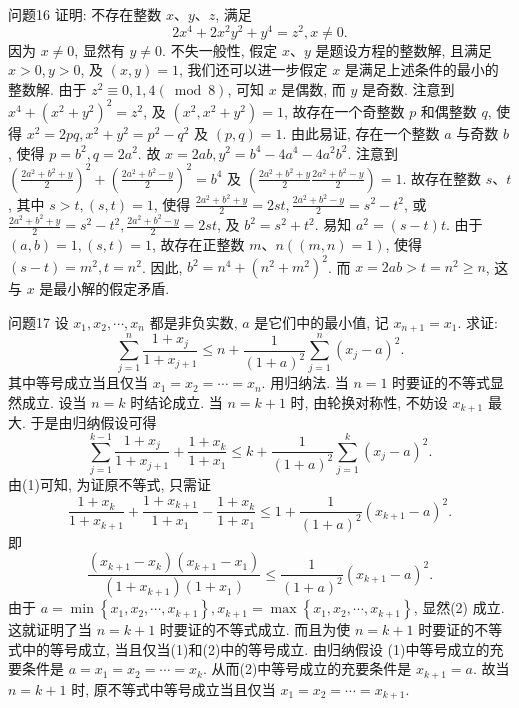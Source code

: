 问题16 证明: 不存在整数 $x 、 y 、 z$, 满足
$$
2 x^4+2 x^2 y^2+y^4=z^2, x \neq 0 .
$$
因为 $x \neq 0$, 显然有 $y \neq 0$. 不失一般性, 假定 $x 、 y$ 是题设方程的整数解, 且满足 $x>0, y>0$, 及 $(x, y)=1$, 我们还可以进一步假定 $x$ 是满足上述条件的最小的整数解.
由于 $z^2 \equiv 0,1,4(\bmod 8)$, 可知 $x$ 是偶数, 而 $y$ 是奇数.
注意到 $x^4+ \left(x^2+y^2\right)^2=z^2$, 及 $\left(x^2, x^2+y^2\right)=1$, 故存在一个奇整数 $p$ 和偶整数 $q$, 使得 $x^2=2 p q, x^2+y^2=p^2-q^2$ 及 $(p, q)=1$. 由此易证, 存在一个整数 $a$ 与奇数 $b$, 使得 $p=b^2, q=2 a^2$. 故 $x=2 a b, y^2=b^4-4 a^4-4 a^2 b^2$.
注意到 $\left(\frac{2 a^2+b^2+y}{2}\right)^2+\left(\frac{2 a^2+b^2-y}{2}\right)^2=b^4$ 及 $\left(\frac{2 a^2+b^2+y}{2} \frac{2 a^2+b^2-y}{2}\right)=1$. 故存在整数 $s 、 t$, 其中 $s>t,(s, t)=1$, 使得 $\frac{2 a^2+b^2+y}{2}= 2 s t, \frac{2 a^2+b^2-y}{2}=s^2-t^2$, 或 $\frac{2 a^2+b^2+y}{2}=s^2-t^2, \frac{2 a^2+b^2-y}{2}=2 s t$, 及 $b^2=s^2+t^2$. 易知 $a^2=(s-t) t$.
由于 $(a, b)=1,(s, t)=1$, 故存在正整数 $m 、 n((m, n)=1)$, 使得 $(s-t)=m^2, t=n^2$. 因此, $b^2=n^4+\left(n^2+m^2\right)^2$. 而 $x=2 a b>t=n^2 \geqslant n$, 这与 $x$ 是最小解的假定矛盾.



问题17 设 $x_1, x_2, \cdots, x_n$ 都是非负实数, $a$ 是它们中的最小值, 记 $x_{n+1}= x_1$. 求证:
$$
\sum_{j=1}^n \frac{1+x_j}{1+x_{j+1}} \leqslant n+\frac{1}{(1+a)^2} \sum_{j=1}^n\left(x_j-a\right)^2 .
$$
其中等号成立当且仅当 $x_1=x_2=\cdots=x_n$.
用归纳法.
当 $n=1$ 时要证的不等式显然成立.
设当 $n=k$ 时结论成立.
当 $n=k+1$ 时, 由轮换对称性, 不妨设 $x_{k+1}$ 最大.
于是由归纳假设可得
$$
\sum_{j=1}^{k-1} \frac{1+x_j}{1+x_{j+1}}+\frac{1+x_k}{1+x_1} \leqslant k+\frac{1}{(1+a)^2} \sum_{j=1}^k\left(x_j-a\right)^2 .
$$
由(1)可知, 为证原不等式, 只需证
$$
\frac{1+x_k}{1+x_{k+1}}+\frac{1+x_{k+1}}{1+x_1}-\frac{1+x_k}{1+x_1} \leqslant 1+\frac{1}{(1+a)^2}\left(x_{k+1}-a\right)^2 .
$$
即
$$
\frac{\left(x_{k+1}-x_k\right)\left(x_{k+1}-x_1\right)}{\left(1+x_{k+1}\right)\left(1+x_1\right)} \leqslant \frac{1}{(1+a)^2}\left(x_{k+1}-a\right)^2 .
$$
由于 $a=\min \left\{x_1, x_2, \cdots, x_{k+1}\right\}, x_{k+1}=\max \left\{x_1, x_2, \cdots, x_{k+1}\right\}$, 显然(2) 成立.
这就证明了当 $n=k+1$ 时要证的不等式成立.
而且为使 $n=k+1$ 时要证的不等式中的等号成立, 当且仅当(1)和(2)中的等号成立.
由归纳假设 (1)中等号成立的充要条件是 $a=x_1=x_2=\cdots=x_k$. 从而(2)中等号成立的充要条件是 $x_{k+1}=a$. 故当 $n=k+1$ 时, 原不等式中等号成立当且仅当 $x_1= x_2=\cdots=x_{k+1}$.



